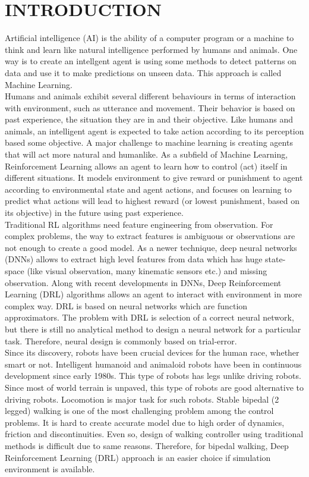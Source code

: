 \chapter{INTRODUCTION}
\label{chap:intro}
Artificial intelligence (AI) is the ability of a computer program or a machine to think and learn like natural intelligence performed by humans and animals.  One way is to create an intellgent agent is using some methods to detect patterns on data and use it to make predictions on unseen data. This approach is called Machine Learning.  \\
Humans and animals exhibit several different behaviours in terms of interaction with environment, such as utterance and movement. Their behavior is based on past experience, the situation they are in and their objective. Like humans and animals, an intelligent agent is expected to take action according to its perception based some objective. A major challenge to machine learning is creating agents that will act more natural and humanlike. As a subfield of Machine Learning, Reinforcement Learning allows an agent to learn how to control (act) itself in different situations. It models environment to give reward or punishment to agent according to environmental state and agent actions, and focuses on learning to predict what actions will lead to highest reward (or lowest punishment, based on its objective) in the future using past experience. \\
Traditional RL algorithms need feature engineering from observation. For complex problems, the way to extract features is ambiguous or observations are not enough to create a good model. As a newer technique, deep neural networks (DNNs) allows to extract high level features from data which has huge state-space (like visual observation, many kinematic sensors etc.) and missing observation. Along with recent developments in DNNs, Deep Reinforcement Learning (DRL) algorithms allows an agent to interact with environment in more complex way. DRL is based on neural networks which are function approximators. The problem with DRL is selection of a correct neural network, but there is still no analytical method to design a neural network for a particular task. Therefore, neural design is commonly based on trial-error. \\
Since its discovery, robots have been crucial devices for the human race, whether smart or not. Intelligent humanoid and animaloid robots have been in continuous development since early 1980s. This type of robots has legs unlike driving robots. Since most of world terrain is unpaved, this type of robots are good alternative to driving robots. Locomotion is major task for such robots. Stable bipedal (2 legged) walking is one of the most challenging problem among the control problems. It is hard to create accurate model due to high order of dynamics, friction and discontinuities. Even so, design of walking controller using traditional methods is difficult due to same reasons. Therefore, for bipedal walking, Deep Reinforcement Learning (DRL) approach is an easier choice if simulation environment is available. \\
